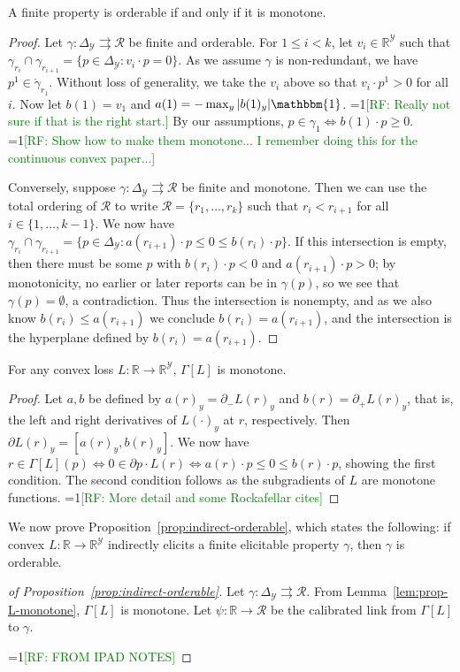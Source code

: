 \documentclass[11pt]{colt2019}
\newcommand{\Comments}{1}
\newcommand{\mynote}[2]{\ifnum\Comments=1\textcolor{#1}{#2}\fi}
\newcommand{\raf}[1]{\mynote{green}{[RF: #1]}}
\newcommand{\reals}{\mathbb{R}}
\newcommand{\prop}[1]{\Gamma[#1]}
\newcommand{\simplex}{\Delta_\Y}
\newcommand{\R}{\mathcal{R}}
\newcommand{\Y}{\mathcal{Y}}
\newcommand{\inter}[1]{\mathring{#1}}%
\newcommand{\toto}{\rightrightarrows}
\newcommand{\ones}{\mathbbm{1}}
\begin{document}
\begin{lemma}\label{lem:orderable-monotone}
  A finite property is orderable if and only if it is monotone.
\end{lemma}
\begin{proof}
  Let $\gamma:\simplex\toto\R$ be finite and orderable.
  For $1 \leq i < k$, let $v_i\in\reals^\Y$ such that $\gamma_{r_i} \cap \gamma_{r_{i+1}} = \{p\in\simplex : v_i\cdot p = 0\}$.
  As we assume $\gamma$ is non-redundant, we have $p^1 \in \inter\gamma_{r_1}$.
  Without loss of generality, we take the $v_i$ above so that $v_i \cdot p^1 > 0$ for all $i$.
  Now let $b(1) = v_1$ and $a(1) = -\max_y |b(1)_y|\ones$.
  \raf{Really not sure if that is the right start.}
  By our assumptions, $p \in \gamma_1 \iff b(1) \cdot p \geq 0$.
  \raf{Show how to make them monotone... I remember doing this for the continuous convex paper...}

  Conversely, suppose $\gamma:\simplex\toto\R$ be finite and monotone.
  Then we can use the total ordering of $\R$ to write $\R = \{r_1,\ldots,r_k\}$ such that $r_i < r_{i+1}$ for all $i \in \{1,\ldots,k-1\}$.
  We now have $\gamma_{r_i} \cap \gamma_{r_{i+1}} = \{p\in\simplex : a(r_{i+1}) \cdot p \leq 0 \leq b(r_i) \cdot p\}$.
  If this intersection is empty, then there must be some $p$ with $b(r_i) \cdot p < 0$ and $a(r_{i+1}) \cdot p > 0$; by monotonicity, no earlier or later reports can be in $\gamma(p)$, so we see that $\gamma(p) = \emptyset$, a contradiction.
  Thus the intersection is nonempty, and as we also know $b(r_i) \leq a(r_{i+1})$ we conclude $b(r_i) = a(r_{i+1})$, and the intersection is the hyperplane defined by $b(r_i) = a(r_{i+1})$.
\end{proof}

\begin{lemma}\label{lem:prop-L-monotone}
  For any convex loss $L : \reals \to \reals^\Y$, $\prop{L}$ is monotone.
\end{lemma}
\begin{proof}
  Let $a,b$ be defined by $a(r)_y = \partial_- L(r)_y$ and $b(r) = \partial_+ L(r)_y$, that is, the left and right derivatives of $L(\cdot)_y$ at $r$, respectively.
  Then $\partial L(r)_y = [a(r)_y,b(r)_y]$.
  We now have $r \in \prop{L}(p) \iff 0 \in \partial p\cdot L(r) \iff a(r)\cdot p \leq 0 \leq b(r) \cdot p$, showing the first condition.
  The second condition follows as the subgradients of $L$ are monotone functions.
  \raf{More detail and some Rockafellar cites}
\end{proof}

We now prove Proposition~\ref{prop:indirect-orderable}, which states the following: if convex $L : \reals \to \reals^\Y$ indirectly elicits a finite elicitable property $\gamma$, then $\gamma$ is orderable.
\begin{proof}[of Proposition~\ref{prop:indirect-orderable}]
  Let $\gamma:\simplex\toto\R$.
  From Lemma~\ref{lem:prop-L-monotone}, $\prop{L}$ is monotone.
  Let $\psi:\reals\to\R$ be the calibrated link from $\prop{L}$ to $\gamma$.

  \raf{FROM IPAD NOTES}
\end{proof}
\end{document}

